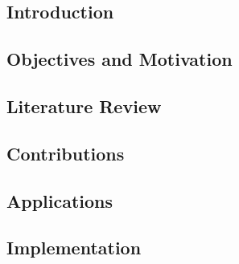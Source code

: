 \documentclass[11pt]{report}
\begin{document}
\begin{doublespace}

\body


\chapter{Introduction}
\label{Ch:Introduction}

\indent


\section{Objectives and Motivation}

\indent


\section{Literature Review}

\indent



\section{Contributions}

\indent



\section{Applications}

\indent



\section{Implementation}

\indent




\end{doublespace}
\end{document}
